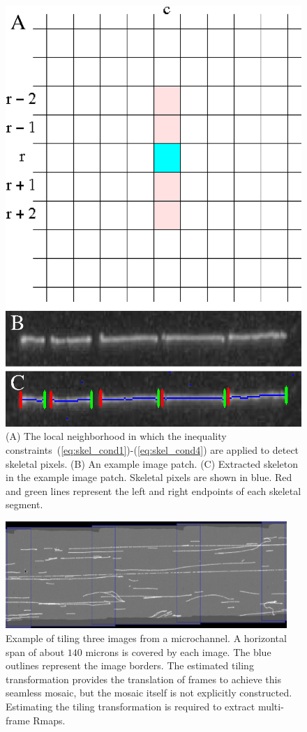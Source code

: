\documentclass{bmcart}
\begin{document}
\begin{backmatter}
\begin{figure}[h!]
\centering
\includegraphics[width=0.9\linewidth]{skeleton_figure}
\caption{
(A) The local neighborhood in which the inequality 
constraints~(\ref{eq:skel_cond1})-(\ref{eq:skel_cond4}) are applied to detect 
skeletal pixels. (B) An example image patch. (C) Extracted skeleton in the 
example image patch. Skeletal pixels are shown in blue. Red and green lines 
represent the left and right endpoints of each skeletal segment.}
\label{fig:skel}
\end{figure}

\begin{figure}[h!]
\centering
\includegraphics[width=0.95\textwidth]{tiling_example}
\caption{
Example of tiling three images from a microchannel. A horizontal span of about 
$140$ microns is covered by each image. The blue outlines represent the image 
borders. The estimated tiling transformation provides the translation 
of frames to achieve this seamless mosaic, but the mosaic itself is not 
explicitly constructed. Estimating the tiling transformation is required to 
extract multi-frame Rmaps.}
\label{fig:tile}
\end{figure}


\end{backmatter}
\end{document}
